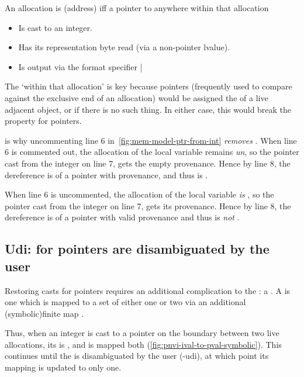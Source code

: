 \begin{definition}
An allocation is (address)  iff a pointer to anywhere within
that allocation
\begin{itemize}
    \item Is cast to an integer.
    \item Has its representation byte read (via a non-pointer lvalue).
    \item Is output via the format specifier \cinline|%
\end{itemize}
\end{definition}

The `within that allocation' is key because  pointers
(frequently used to compare against the exclusive end of an allocation) would
be assigned the  of a live adjacent object, or
 if there is no such thing. In either case, this would break
the  property for  pointers.

 is why uncommenting line 6
in~\cref{fig:mem-model-ptr-from-int} \emph{removes} . When line 6 is
commented out, the allocation of the local variable  remains
\emph{un}, so the pointer  cast from the integer
 on line 7, gets the empty provenance. Hence by line 8, the
dereference is of a pointer with  provenance, and thus is
.

When line 6 is uncommented, the allocation of the local variable  \emph{is} , so the pointer  cast from the integer
 on line 7, gets its provenance. Hence by line 8, the dereference is
of a pointer with valid provenance and thus is \emph{not} .

\subsection{Udi:  for  pointers are
disambiguated by the user}

Restoring  casts for  pointers requires an
additional complication to the : a . A  is one which is mapped to a set of
either one or two  via an additional \kl(symbolic){finite
map} \sm{\mathit{\color{violet}{S}}}.

Thus, when an integer is cast to a  pointer on the boundary
between two live allocations, its  is , and is
mapped both  (\cref{fig:pnvi-ival-to-pval-symbolic}). This
continues until the  is disambiguated by the user
(-udi), at which point its mapping is updated to only one.

